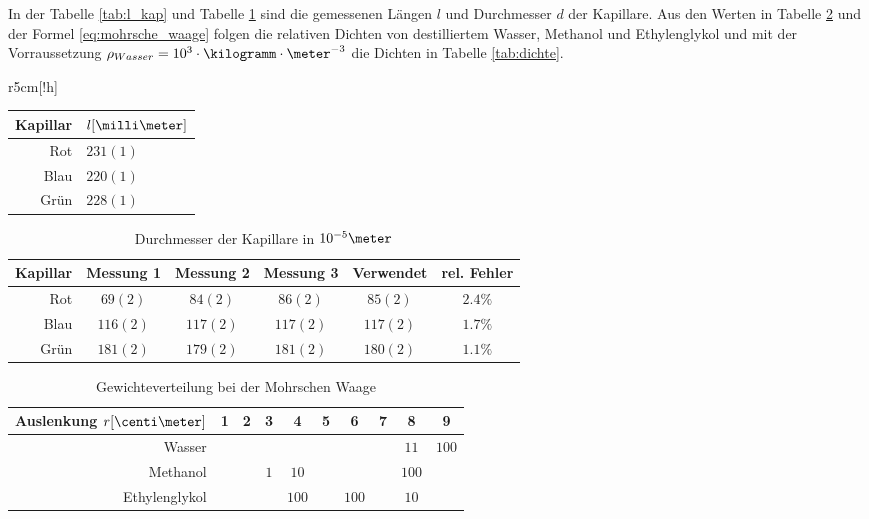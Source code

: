 \documentclass[12pt, a4paper, twoside]{scrartcl}
\begin{document}
In der Tabelle \ref{tab:l_kap} und Tabelle \ref{tab:d_kap} sind die gemessenen Längen $l$ und Durchmesser $d$ der Kapillare.
Aus den Werten in Tabelle \ref{tab:mohrsche_waage} und der Formel \eqref{eq:mohrsche_waage} folgen die relativen Dichten von destilliertem Wasser, Methanol und Ethylenglykol und mit der Vorraussetzung $\rho _{Wasser} = 10^{3}\cdot\kilogramm\cdot\meter^{-3}$ die Dichten in Tabelle \ref{tab:dichte}.

\begin{wraptable}{r}{5cm}[!h]
\centering
\begin{tabular}{r|l}
    Kapillar & $l[\milli\meter]$\\
    \hline
    Rot & $231(1)$\\
    Blau & $220(1)$\\
    Grün & $228(1)$\\
    
 \end{tabular} 
 \caption{\label{tab:l_kap}Länge $l$ der Kapillare}
\end{wraptable}

\begin{table}[!h]
\centering
\begin{tabular}{r|c|c|c||c|c}
    Kapillar & Messung 1 & Messung 2 & Messung 3 & Verwendet & rel. Fehler\\
    \hline
    Rot & $69(2)$ & $84(2)$ & $86(2)$ & $85(2)$ & $ 2.4\%$\\
    Blau & $116(2)$ & $117(2)$ & $117(2)$ & $117(2)$ & $ 1.7\%$\\
    Grün & $181(2)$ & $179(2)$ & $181(2)$ & $180(2)$ & $ 1.1\%$\\
    
 \end{tabular} 
 \caption{\label{tab:d_kap} Durchmesser der Kapillare in $ 10^{-5} \meter$}
\end{table}

\begin{table}[!h]
\centering
\begin{tabular}{r|c|c|c|c|c|c|c|c|c}
    Auslenkung $r[\centi\meter]$ & 1 & 2 & 3 & 4 & 5 & 6 & 7 & 8 & 9\\
    \hline
    \hline
    Wasser & & & & & & & & $11$ & $100$ \\
    \hline
    Methanol & & & $1$ & $10$ & & & & $100$ & \\
    \hline
    Ethylenglykol & & & & $100$ & & $100$ & & $10$ & \\
    
 \end{tabular} 
 \caption{\label{tab:mohrsche_waage}Gewichteverteilung bei der Mohrschen Waage}
\end{table}
\end{document}
